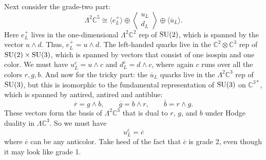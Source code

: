 \documentclass[12pt]{article}
\newcommand{\C}{{\mathbb C}}  %
\newcommand{\SU}{{\rm SU}}    %
\newcommand{\Ex}{\Lambda} %
\newcommand{\iso}{\cong} %
\newcommand{\ubar}{\overline{u}} %
\newcommand{\rbar}{{\overline{r}}} %
\newcommand{\gbar}{{\overline{g}}} %
\newcommand{\bbar}{{\overline{b}}} %
\newcommand{\cbar}{{\overline{c}}} %
\newcommand{\angquark}{\left\langle \! \begin{array}{c} u_L \\ d_L \end{array} \! \right\rangle} %
\begin{document}
Next consider the grade-two part:
\[        \Ex^2 \C^5  \iso  \langle e^+_L \rangle \oplus \angquark \oplus 
\langle \ubar_L \rangle .\]
Here $e^+_L$ lives in the one-dimensional $\Ex^2 \C^2$ rep
of $\SU(2)$, which is spanned by the vector $u \wedge d$. 
Thus, $e^+_L = u \wedge d$.  The left-handed quarks 
live in the $\C^2 \otimes \C^3$ rep of $\SU(2) \times \SU(3)$,
which is spanned by vectors that consist of one isospin and one color. We must
have $u^c_L = u \wedge c$ and $d^c_L = d \wedge c$, where again $c$ runs 
over all the colors $r,g,b$.  And now for the tricky part: the $\ubar_L$ 
quarks live in the $\Ex^2 \C^3$ rep of $\SU(3)$, but this is isomorphic 
to the fundamental representation of $\SU(3)$ on $\C^{3*}$, which is
spanned by antired, antired and antiblue:
\[ \rbar = g \wedge b , \qquad
   \gbar = b \wedge r , \qquad
   \bbar = r \wedge g. \]
These vectors form the basis of $\Ex^2 \C^3$ that is dual to $r$, $g$, 
and $b$ under Hodge duality in $\Ex \C^3$.  So we must have
\[ u^\cbar_L = \cbar \]
where $\cbar$ can be any anticolor.  Take heed of the fact that $\cbar$ 
is grade 2, even though it may look like grade 1.
\end{document}
